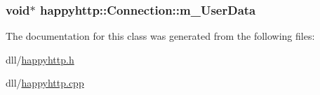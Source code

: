 \subsubsection[{\texorpdfstring{m\+\_\+\+User\+Data}{m_UserData}}]{\setlength{\rightskip}{0pt plus 5cm}void$\ast$ happyhttp\+::\+Connection\+::m\+\_\+\+User\+Data\hspace{0.3cm}{\ttfamily [protected]}}\hypertarget{classhappyhttp_1_1_connection_ab5a1160ccd2974557dc574ff650f02e0}{}\label{classhappyhttp_1_1_connection_ab5a1160ccd2974557dc574ff650f02e0}


The documentation for this class was generated from the following files\+:\begin{DoxyCompactItemize}
\item 
dll/\hyperlink{happyhttp_8h}{happyhttp.\+h}\item 
dll/\hyperlink{happyhttp_8cpp}{happyhttp.\+cpp}\end{DoxyCompactItemize}
